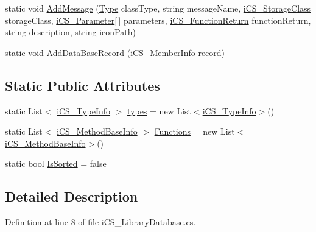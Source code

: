 \begin{DoxyCompactItemize}
\item 
static void \hyperlink{classi_c_s___library_database_a888695a1646154977f08ec865edc8801}{Add\+Message} (\hyperlink{i_c_s___object_type_enum_8cs_ae6c3dd6d8597380b56d94908eb431547aa1fa27779242b4902f7ae3bdd5c6d508}{Type} class\+Type, string message\+Name, \hyperlink{i_c_s___storage_class_8cs_a4e1bb1da155050e4b0d0118f813194aa}{i\+C\+S\+\_\+\+Storage\+Class} storage\+Class, \hyperlink{classi_c_s___parameter}{i\+C\+S\+\_\+\+Parameter}\mbox{[}$\,$\mbox{]} parameters, \hyperlink{classi_c_s___function_return}{i\+C\+S\+\_\+\+Function\+Return} function\+Return, string description, string icon\+Path)
\item 
static void \hyperlink{classi_c_s___library_database_a21f321c19aa7462da8dbdc0de8674308}{Add\+Data\+Base\+Record} (\hyperlink{classi_c_s___member_info}{i\+C\+S\+\_\+\+Member\+Info} record)
\end{DoxyCompactItemize}
\subsection*{Static Public Attributes}
\begin{DoxyCompactItemize}
\item 
static List$<$ \hyperlink{classi_c_s___type_info}{i\+C\+S\+\_\+\+Type\+Info} $>$ \hyperlink{classi_c_s___library_database_ae655472bf960359e100eb1c6d277bd1b}{types} = new List$<$\hyperlink{classi_c_s___type_info}{i\+C\+S\+\_\+\+Type\+Info}$>$()
\item 
static List$<$ \hyperlink{classi_c_s___method_base_info}{i\+C\+S\+\_\+\+Method\+Base\+Info} $>$ \hyperlink{classi_c_s___library_database_a35f2d99926a50bfe7b83954a89636b6d}{Functions} = new List$<$\hyperlink{classi_c_s___method_base_info}{i\+C\+S\+\_\+\+Method\+Base\+Info}$>$()
\item 
static bool \hyperlink{classi_c_s___library_database_a992cd8b3df732b6aad4b8dda0de8db34}{Is\+Sorted} = false
\end{DoxyCompactItemize}


\subsection{Detailed Description}


Definition at line 8 of file i\+C\+S\+\_\+\+Library\+Database.\+cs.



